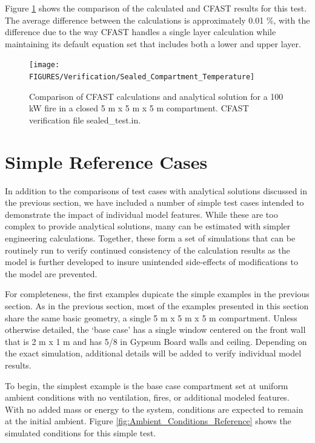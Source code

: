  Figure \ref{fig:Analytical_Closed_Compartment} shows the comparison of the calculated and CFAST results for this test. The average difference between the calculations is approximately 0.01 \%, with the difference due to the way CFAST handles a single layer calculation while maintaining its default equation set that includes both a lower and upper layer.

\begin{figure}[h]
\begin{center}
\texttt{[image: FIGURES/Verification/Sealed\_Compartment\_Temperature]}
\caption{Comparison of CFAST calculations and analytical solution for a 100 kW fire in a closed 5 m x 5 m x 5 m compartment.  CFAST verification file sealed\_test.in.}
\label{fig:Analytical_Closed_Compartment}
\end{center}
\end{figure}

\section{Simple Reference Cases}

In addition to the comparisons of test cases with analytical solutions discussed in the previous section, we have included a number of simple test cases intended to demonstrate the impact of individual model features.  While these are too complex to provide analytical solutions, many can be estimated with simpler engineering calculations.  Together, these form a set of simulations that can be routinely run to verify continued consistency of the calculation results as the model is further developed to insure unintended side-effects of modifications to the model are prevented.

For completeness, the first examples dupicate the simple examples in the previous section. As in the previous section,  most of the examples presented in this section share the same basic geometry, a single 5 m x 5 m x 5 m compartment. Unless otherwise detailed, the ‘base case’ has a single window centered on the front wall that is 2 m x 1 m and has 5/8 in Gypsum Board walls and ceiling. Depending on the exact simulation, additional details will be added to verify individual model results. 

To begin, the simplest example is the base case compartment set at uniform ambient conditions with no ventilation, fires, or additional modeled features. With no added mass or energy to the system, conditions are expected to remain at the initial ambient. Figure \ref{fig:Ambient_Conditions_Reference} shows the simulated conditions for this simple test.

